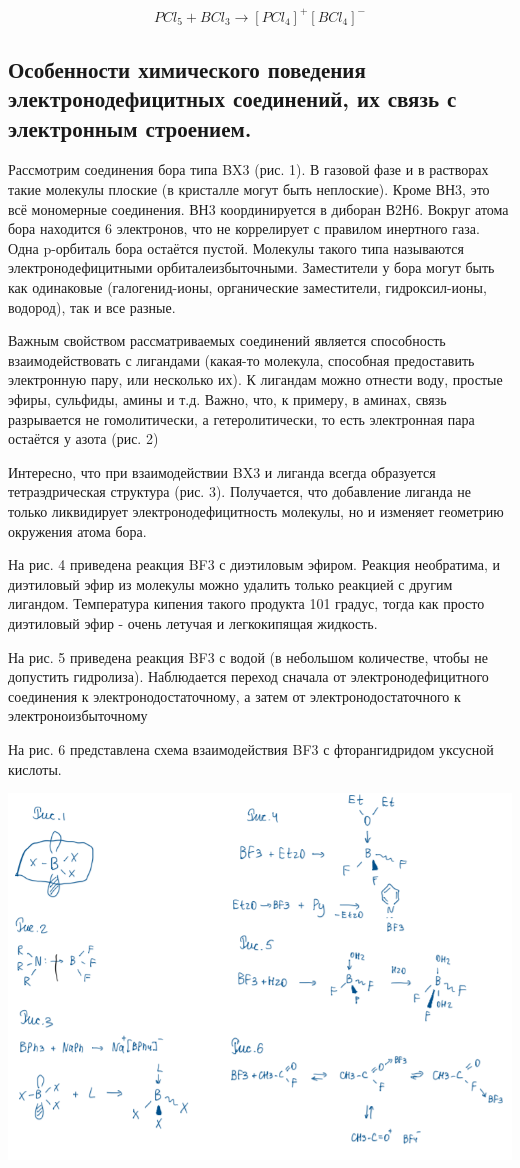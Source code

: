 \documentclass[14pt,a4paper]{scrartcl}
\begin{document}
$$PCl_5 + BCl_3 \rightarrow [PCl_4]^+[BCl_4]^-$$

\subsection{Особенности химического поведения электронодефицитных соединений, их связь с электронным строением.}

Рассмотрим соединения бора типа BX3 (рис. 1). В газовой фазе и в растворах такие молекулы плоские (в кристалле могут быть неплоские). Кроме ВН3, это всё мономерные
соединения. ВН3 координируется в диборан В2Н6. Вокруг атома бора находится 6 электронов, что не коррелирует с правилом инертного газа. Одна p-орбиталь бора остаётся пустой.
Молекулы такого типа называются электронодефицитными орбиталеизбыточными. Заместители у бора могут быть как одинаковые (галогенид-ионы, органические заместители,
гидроксил-ионы, водород), так и все разные.

Важным свойством рассматриваемых соединений является способность взаимодействовать с лигандами (какая-то молекула, способная предоставить электронную пару, или
несколько их). К лигандам можно отнести воду, простые эфиры, сульфиды, амины и т.д. Важно, что, к примеру, в аминах, связь разрывается не гомолитически, а гетеролитически, то
есть электронная пара остаётся у азота (рис. 2)

Интересно, что при взаимодействии BX3 и лиганда всегда образуется тетраэдрическая структура (рис. 3). Получается, что добавление лиганда не только ликвидирует
электронодефицитность молекулы, но и изменяет геометрию окружения атома бора. 

На рис. 4 приведена реакция BF3 с диэтиловым эфиром. Реакция необратима, и диэтиловый эфир из молекулы можно удалить только реакцией с другим лигандом. Температура
кипения такого продукта 101 градус, тогда как просто диэтиловый эфир - очень летучая и легкокипящая жидкость.

На рис. 5 приведена реакция BF3 с водой (в небольшом количестве, чтобы не допустить гидролиза). Наблюдается переход сначала от электронодефицитного соединения к
электронодостаточному, а затем от электронодостаточного к электроноизбыточному

На рис. 6 представлена схема взаимодействия BF3 с фторангидридом уксусной кислоты.

\includegraphics{16v1.png}
\end{document}
